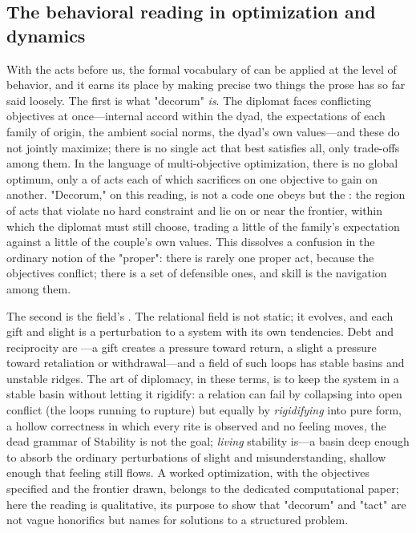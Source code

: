 \subsection{The behavioral reading in optimization and dynamics}
With the acts before us, the formal vocabulary of  can be applied at the level of behavior, and it earns its place by making precise two things the prose has so far said loosely. The first is what "decorum" \emph{is}. The diplomat faces conflicting objectives at once---internal accord within the dyad, the expectations of each family of origin, the ambient social norms, the dyad's own values---and these do not jointly maximize; there is no single act that best satisfies all, only trade-offs among them. In the language of multi-objective optimization, there is no global optimum, only a  of acts each of which sacrifices on one objective to gain on another. "Decorum," on this reading, is not a code one obeys but the : the region of acts that violate no hard constraint and lie on or near the frontier, within which the diplomat must still choose, trading a little of the family's expectation against a little of the couple's own values. This dissolves a confusion in the ordinary notion of the "proper": there is rarely one proper act, because the objectives conflict; there is a set of defensible ones, and skill is the navigation among them.

The second is the field's . The relational field is not static; it evolves, and each gift and slight is a perturbation to a system with its own tendencies. Debt and reciprocity are ---a gift creates a pressure toward return, a slight a pressure toward retaliation or withdrawal---and a field of such loops has stable basins and unstable ridges. The art of diplomacy, in these terms, is to keep the system in a stable basin without letting it rigidify: a relation can fail by collapsing into open conflict (the loops running to rupture) but equally by \emph{rigidifying} into pure form, a hollow correctness in which every rite is observed and no feeling moves, the dead grammar of  Stability is not the goal; \emph{living} stability is---a basin deep enough to absorb the ordinary perturbations of slight and misunderstanding, shallow enough that feeling still flows. A worked optimization, with the objectives specified and the frontier drawn, belongs to the dedicated computational paper; here the reading is qualitative, its purpose to show that "decorum" and "tact" are not vague honorifics but names for solutions to a structured problem.

